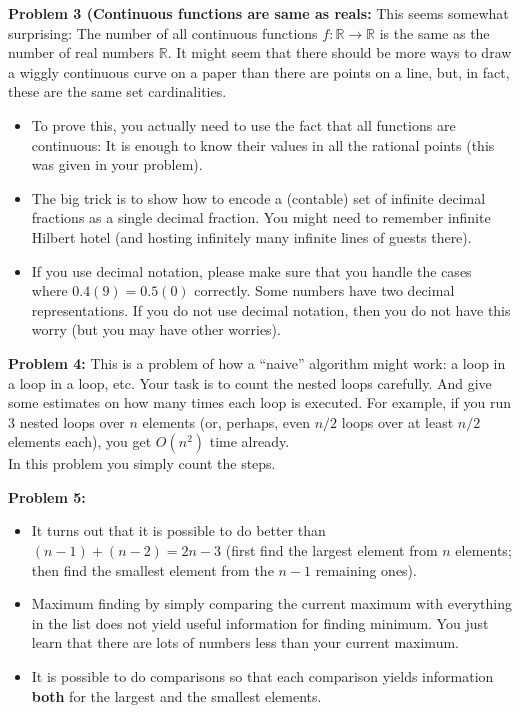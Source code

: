 \documentclass[jou]{apa6}
\begin{document}
\vspace{2ex}
{\bf Problem 3 (Continuous functions are same as reals:} 
This seems somewhat surprising: The number of all continuous functions $f: \mathbb{R} \rightarrow \mathbb{R}$
is the same as the number of real numbers $\mathbb{R}$. It might seem that there should be more ways to draw a wiggly
continuous curve on a paper than there are points on a line, but, in fact, these are the same set cardinalities.
\begin{itemize}
\item To prove this, you actually need to use the fact that all functions are continuous: It is 
enough to know their values in all the rational points (this was given in your problem). 
\item The big trick is to show how to encode a (contable) set of infinite decimal fractions
as a single decimal fraction. You might need to remember infinite Hilbert hotel
(and hosting infinitely many infinite lines of guests there). 
\item If you use decimal notation, please make sure that you handle the cases 
where $0.4(9) = 0.5(0)$ correctly. Some numbers have two decimal representations. 
If you do not use decimal notation, then you do not have this worry (but you may have other worries).
\end{itemize}




\vspace{2ex}
{\bf Problem 4:} This is a problem of how a ``naive'' algorithm might work: a loop in a loop in a loop, etc. 
Your task is to count the nested loops carefully. And give some estimates on how many times each loop is executed. 
For example, if you run 3 nested loops over $n$ elements (or, perhaps, even $n/2$ loops over at least
$n/2$ elements each), you get $O(n^2)$ time already.\\
In this problem you simply count the steps. 


\vspace{2ex}
{\bf Problem 5:} 
\begin{itemize}
\item It turns out that it is possible to do better than $(n-1) + (n-2) = 2n-3$ (first find the 
largest element from $n$ elements; then find the smallest element from the $n-1$ remaining ones). 
\item 
Maximum finding by simply comparing the current maximum with everything in the list
does not yield useful information for finding minimum. You just learn that there are lots of 
numbers less than your current maximum. 
\item It is possible to do comparisons so that each comparison yields information 
{\bf both} for the largest and the smallest elements.
\end{itemize}
\end{document}
